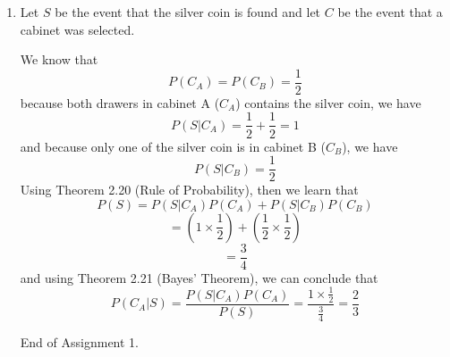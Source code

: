 \documentclass[12pt]{article}
\begin{document}
\begin{enumerate}
	\item Let $S$ be the event that the silver coin is found and let $C$ be the event that a cabinet was selected.

	We know that
	$$P(C_A) = P(C_B) = \frac{1}{2}$$
	because both drawers in cabinet A ($C_A$) contains the silver coin, we have 
	$$P(S|C_A) = \frac{1}{2} + \frac{1}{2} = 1$$
	and because only one of the silver coin is in cabinet B ($C_B$), we have
	$$P(S|C_B) = \frac{1}{2}$$
	Using Theorem 2.20 (Rule of Probability), then we learn that 
	$$P(S) = P(S|C_A)P(C_A) + P(S|C_B)P(C_B)$$
	$$= (1 \times \frac{1}{2}) + (\frac{1}{2} \times \frac{1}{2})$$
	$$= \frac{3}{4}$$
	and using Theorem 2.21 (Bayes' Theorem), we can conclude that
	$$P(C_A|S) = \frac{P(S|C_A)P(C_A)}{P(S)} = \frac{1 \times \frac{1}{2}}{\frac{3}{4}} = \frac{2}{3}$$
	
	End of Assignment 1.
	
	
	
	
	
	
	
\end{enumerate}
\end{document}
